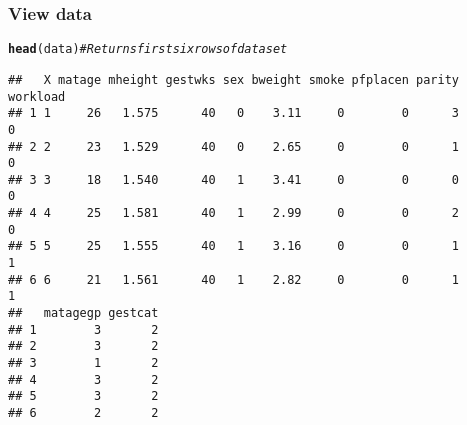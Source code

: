 \documentclass[pdf]{beamer}\usepackage[]{graphicx}\usepackage[]{color}
\makeatletter
\newcommand{\hlcom}[1]{\textcolor[rgb]{0.678,0.584,0.686}{\textit{#1}}}%
\newcommand{\hlstd}[1]{\textcolor[rgb]{0.345,0.345,0.345}{#1}}%
\newcommand{\hlkwd}[1]{\textcolor[rgb]{0.737,0.353,0.396}{\textbf{#1}}}%
\newenvironment{kframe}{%
 \def\at@end@of@kframe{}%
 \ifinner\ifhmode%
  \def\at@end@of@kframe{\end{minipage}}%
  \begin{minipage}{\columnwidth}%
 \fi\fi%
 \def\FrameCommand##1{\hskip\@totalleftmargin \hskip-\fboxsep
 \colorbox{shadecolor}{##1}\hskip-\fboxsep
     \hskip-\linewidth \hskip-\@totalleftmargin \hskip\columnwidth}%
 \MakeFramed {\advance\hsize-\width
   \@totalleftmargin\z@ \linewidth\hsize
   \@setminipage}}%
 {\par\unskip\endMakeFramed%
 \at@end@of@kframe}
\newenvironment{knitrout}{}{} %
\makeatother
\begin{document}
\begin{frame}[fragile]\frametitle{View data}
\begin{knitrout}
\color{fgcolor}\begin{kframe}
\begin{alltt}
\hlkwd{head}\hlstd{(data)}  \hlcom{#Returns first six rows of dataset}
\end{alltt}
\begin{verbatim}
##   X matage mheight gestwks sex bweight smoke pfplacen parity workload
## 1 1     26   1.575      40   0    3.11     0        0      3        0
## 2 2     23   1.529      40   0    2.65     0        0      1        0
## 3 3     18   1.540      40   1    3.41     0        0      0        0
## 4 4     25   1.581      40   1    2.99     0        0      2        0
## 5 5     25   1.555      40   1    3.16     0        0      1        1
## 6 6     21   1.561      40   1    2.82     0        0      1        1
##   matagegp gestcat
## 1        3       2
## 2        3       2
## 3        1       2
## 4        3       2
## 5        3       2
## 6        2       2
\end{verbatim}
\end{kframe}
\end{knitrout}
\end{frame}
\end{document}
